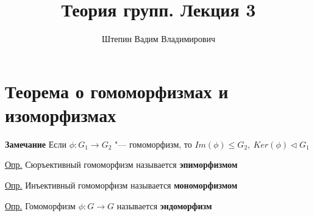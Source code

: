 \documentclass{article}
\title{Теория групп. Лекция 3}
\author{Штепин Вадим Владимирович}
\date{\DTMdate{2019-09-19}}
\begin{document}
\maketitle

\section*{Теорема о гомоморфизмах и изоморфизмах}

\textbf{Замечание}
Если $\phi: G_1 \rightarrow G_2$ "--- гомоморфизм, то $Im(\phi) \leq G_2, \  Ker(\phi) \triangleleft G_1$

\vspace{10pt}

\underline{Опр.} Сюръективный гомоморфизм называется \textbf{эпиморфизмом}

\vspace{10pt}

\underline{Опр.} Инъективный гомоморфизм называется \textbf{мономорфизмом}

\vspace{10pt}

\underline{Опр.} Гомоморфизм $\phi: G \rightarrow G$ называется \textbf{эндоморфизм}

\vspace{10pt}
\end{document}
